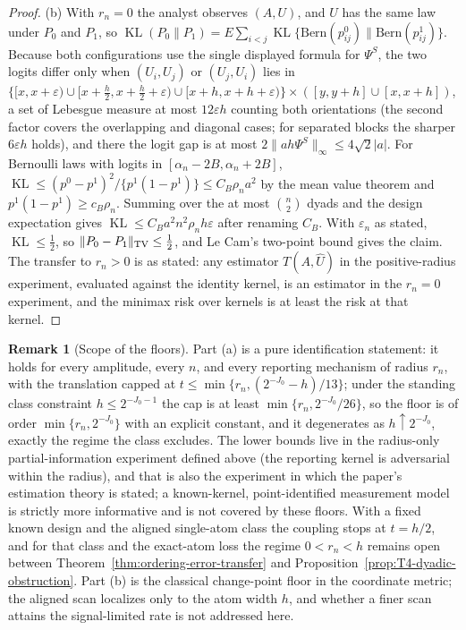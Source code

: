 \documentclass[11pt]{article}
\theoremstyle{definition}
\newtheorem{remark}[definition]{Remark}
\newcommand{\1}{\mathbf 1}\newcommand{\op}{\operatorname}
\begin{document}
\begin{proof}
(b) With $r_n=0$ the analyst observes $(A,U)$, and $U$ has the same law under
$P_0$ and $P_1$, so $\operatorname{KL}(P_0\|P_1)=E\sum_{i<j}
\operatorname{KL}\{\mathrm{Bern}(p^0_{ij})\|\mathrm{Bern}(p^1_{ij})\}$.
Because both configurations use the single displayed formula for $\Psi^S$, the
two logits differ only when $(U_i,U_j)$ or $(U_j,U_i)$ lies in
$\{[x,x+\varepsilon)\cup[x+\tfrac h2,x+\tfrac h2+\varepsilon)\cup[x+h,x+h+\varepsilon)\}
\times([y,y+h]\cup[x,x+h])$, a set of Lebesgue measure at most
$12\varepsilon h$ counting both orientations (the second factor covers the
overlapping and diagonal cases; for separated blocks the sharper $6\varepsilon
h$ holds), and there the logit gap is at most
$2\|a h\Psi^S\|_\infty\le4\sqrt2|a|$.  For Bernoulli laws with logits in
$[\alpha_n-2B,\alpha_n+2B]$,
$\operatorname{KL}\le(p^0-p^1)^2/\{p^1(1-p^1)\}\le C_B\rho_na^2$ by the mean
value theorem and $p^1(1-p^1)\ge c_B\rho_n$.  Summing over the at most
$\binom n2$ dyads and the design expectation gives
$\operatorname{KL}\le C_Ba^2n^2\rho_nh\varepsilon$ after renaming $C_B$.  With
$\varepsilon_n$ as stated, $\operatorname{KL}\le\tfrac12$, so
$\|P_0-P_1\|_{\rm TV}\le\tfrac12$, and Le Cam's two-point bound gives the
claim.  The transfer to $r_n>0$ is as stated: any estimator
$T(A,\widehat U)$ in the positive-radius experiment, evaluated against the
identity kernel, is an estimator in the $r_n=0$ experiment, and the minimax
risk over kernels is at least the risk at that kernel.
\end{proof}

\begin{remark}[Scope of the floors]\label{rem:S-allradius}
Part (a) is a pure identification statement: it holds for every amplitude,
every $n$, and every reporting mechanism of radius $r_n$, with the translation
capped at $t\le\min\{r_n,(2^{-J_0}-h)/13\}$; under the standing class
constraint $h\le2^{-J_0-1}$ the cap is at least $\min\{r_n,2^{-J_0}/26\}$, so
the floor is of order $\min\{r_n,2^{-J_0}\}$ with an explicit constant, and it
degenerates as $h\uparrow2^{-J_0}$, exactly the regime the class excludes.
The lower bounds live in the radius-only partial-information experiment
defined above (the reporting kernel is adversarial within the radius), and
that is also the experiment in which the paper's estimation theory is stated;
a known-kernel, point-identified measurement model is strictly more
informative and is not covered by these floors.  With a fixed known design and
the aligned single-atom class the coupling stops at $t=h/2$, and for that
class and the exact-atom loss the regime $0<r_n<h$ remains open between
Theorem~\ref{thm:ordering-error-transfer} and
Proposition~\ref{prop:T4-dyadic-obstruction}.  Part (b) is the classical
change-point floor in the coordinate metric; the aligned scan localizes only
to the atom width $h$, and whether a finer scan attains the signal-limited
rate is not addressed here.
\end{remark}
\end{document}
